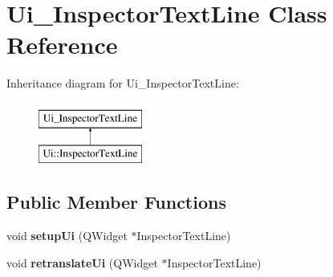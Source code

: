 \hypertarget{class_ui___inspector_text_line}{}\section{Ui\+\_\+\+Inspector\+Text\+Line Class Reference}
\label{class_ui___inspector_text_line}
Inheritance diagram for Ui\+\_\+\+Inspector\+Text\+Line\+:\begin{figure}[H]
\begin{center}
\leavevmode
\includegraphics[height=2.000000cm]{class_ui___inspector_text_line}
\end{center}
\end{figure}
\subsection*{Public Member Functions}
\begin{DoxyCompactItemize}
\item 
\mbox{\label{class_ui___inspector_text_line_a62173935ac318655c87e022277aaf897}} 
void {\bfseries setup\+Ui} (Q\+Widget $\ast$Inspector\+Text\+Line)
\item 
\mbox{\label{class_ui___inspector_text_line_a0dfca0fed9991f8054aaa50ea17840c3}} 
void {\bfseries retranslate\+Ui} (Q\+Widget $\ast$Inspector\+Text\+Line)
\end{DoxyCompactItemize}
